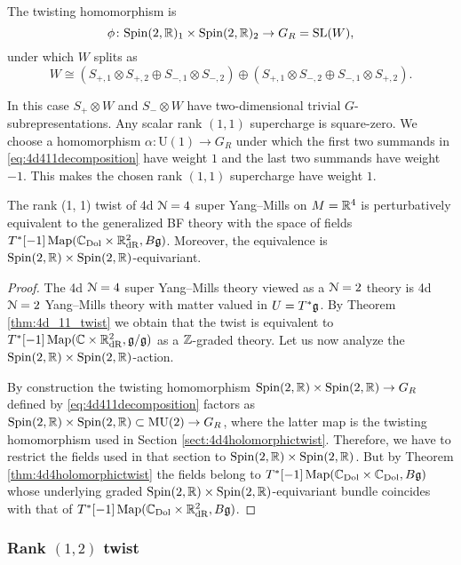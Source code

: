 \documentclass[10pt, oneside]{article}
\newcommand{\MU}{\mathrm{MU}}
\renewcommand{\U}{\mathrm{U}}
\begin{document}
The twisting homomorphism is
\[
\phi \colon \mathrm{Spin}(2, \mathbb R)_1 \times \mathrm{Spin}(2, \mathbb R)_2 \to G_R=\mathrm{SL}(W),
\]
under which $W$ splits as
\begin{equation}
W\cong (S_{+, 1}\otimes S_{+, 2}\oplus S_{-, 1}\otimes S_{-, 2})\oplus (S_{+, 1}\otimes S_{-, 2}\oplus S_{-, 1}\otimes S_{+, 2}).
\label{eq:4d411decomposition}
\end{equation}

In this case $S_+\otimes W$ and $S_-\otimes W$ have two-dimensional trivial $G$-subrepresentations. Any scalar rank $(1, 1)$ supercharge is square-zero. We choose a homomorphism $\alpha\colon \U(1)\rightarrow G_R$ under which the first two summands in \eqref{eq:4d411decomposition} have weight $1$ and the last two summands have weight $-1$. This makes the chosen rank $(1, 1)$ supercharge have weight $1$.

\begin{theorem}
The rank (1, 1) twist of 4d $\mathcal N=4$ super Yang--Mills on $M=\mathbb R^4$ is perturbatively equivalent to the generalized BF theory with the space of fields $T^*[-1] \operatorname{Map}(\mathbb C_{\rm Dol}\times \mathbb R^2_{\mathrm{dR}}, B \mathfrak g)$. Moreover, the equivalence is $\mathrm{Spin}(2, \mathbb R)\times \mathrm{Spin}(2, \mathbb R)$-equivariant.
\label{thm:4d4partialtwist}
\end{theorem}
\begin{proof}
The 4d $\mathcal N=4$ super Yang--Mills theory viewed as a $\mathcal N=2$ theory is 4d $\mathcal N=2$ Yang--Mills theory with matter valued in $U=T^*\mathfrak g$. By Theorem \ref{thm:4d_11_twist} we obtain that the twist is equivalent to $T^*[-1]\operatorname{Map}(\mathbb C\times \mathbb R^2_{\mathrm{dR}}, \mathfrak g/\mathfrak g)$ as a $\mathbb Z$-graded theory. Let us now analyze the $\mathrm{Spin}(2, \mathbb R)\times \mathrm{Spin}(2, \mathbb R)$-action.

By construction the twisting homomorphism $\mathrm{Spin}(2,\mathbb R)\times \mathrm{Spin}(2, \mathbb R)\rightarrow G_R$ defined by \eqref{eq:4d411decomposition} factors as $\Spin(2, \RR)\times \Spin(2, \RR)\subset \MU(2)\rightarrow G_R$, where the latter map is the twisting homomorphism used in Section \ref{sect:4d4holomorphictwist}. Therefore, we have to restrict the fields used in that section to $\mathrm{Spin}(2, \mathbb R)\times \mathrm{Spin}(2, \mathbb R)$. But by Theorem \ref{thm:4d4holomorphictwist} the fields belong to $T^*[-1]\operatorname{Map}(\mathbb C_{\rm Dol}\times \mathbb C_{\rm Dol}, B\mathfrak g)$ whose underlying graded $\mathrm{Spin}(2, \mathbb R)\times \mathrm{Spin}(2, \mathbb R)$-equivariant bundle coincides with that of $T^*[-1]\operatorname{Map}(\mathbb C_{\rm Dol}\times \mathbb R^2_{\mathrm{dR}}, B\mathfrak g)$.
\end{proof}

\subsubsection{Rank \texorpdfstring{$(1, 2)$}{(1,2)} twist}
\end{document}
